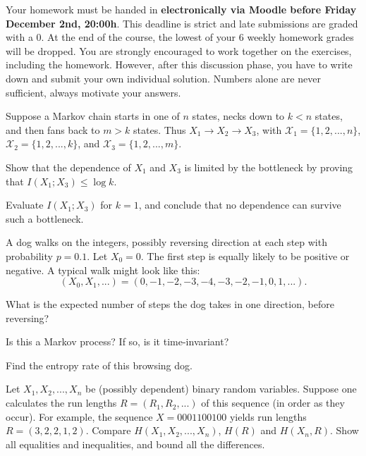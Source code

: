\documentclass[a4paper,10pt,landscape,twocolumn]{scrartcl}
\newcommand\deadline{Friday December 2nd, 20:00h}
\begin{document}
\homeworkproblems

{\sffamily\noindent
Your homework must be handed in \textbf{electronically via Moodle before \deadline}. This deadline is strict and late submissions are graded with a 0. At the end of the course, the lowest of your 6 weekly homework grades will be dropped. You are strongly encouraged to work together on the exercises, including the homework. However, after this discussion phase, you have to write down and submit your own individual solution. Numbers alone are never sufficient, always motivate your answers.
}


\begin{exercise}[Bottleneck (4pt)]
Suppose a Markov chain starts in one of $n$ states, necks down to $k < n$ states, and then fans back to $m > k$ states. Thus $X_1 \to X_2 \to X_3$, with $\mathcal{X}_1 = \{1, 2, ..., n\}$, $\mathcal{X}_2 = \{1, 2, ..., k\}$, and $\mathcal{X}_3 = \{1, 2, ..., m\}$.
\begin{subex}[(3pt)]
Show that the dependence of $X_1$ and $X_3$ is limited by the bottleneck by proving that $I(X_1;X_3) \leq \log k$.
\end{subex}
\begin{subex}[(1pt)]
Evaluate $I(X_1;X_3)$ for $k = 1$, and conclude that no dependence can survive such a bottleneck.
\end{subex}
\end{exercise}






\begin{exercise}
A dog walks on the integers, possibly reversing direction at each step with probability $p = 0.1$. Let $X_0 = 0$. The first step is equally likely to be positive or negative. A typical walk might look like this:
\[
(X_0, X_1, ...) = (0, -1, -2, -3, -4, -3, -2, -1, 0, 1, ...).
\]
	\begin{subex}[(2pt)]
	What is the expected number of steps the dog takes in one direction, before reversing?
	\end{subex}
	\begin{subex}[(1pt)]
	Is this a Markov process? If so, is it time-invariant?
	\end{subex}
	\begin{subex}[(3pt)]
	Find the entropy rate of this browsing dog.
	\end{subex}
\end{exercise}

\begin{exercise}
Let $X_1, X_2, ..., X_n$ be (possibly dependent) binary random variables.
Suppose one calculates the run lengths $R = (R_1, R_2, ...)$ of this sequence (in order as they occur).
For example, the sequence $X = 0001100100$ yields run lengths $R = (3, 2, 2, 1, 2)$. Compare
$H(X_1, X_2, . . . , X_n)$, $H(R)$ and $H(X_n, R)$. Show all equalities and inequalities, and bound all the
differences.
\end{exercise}
\end{document}
